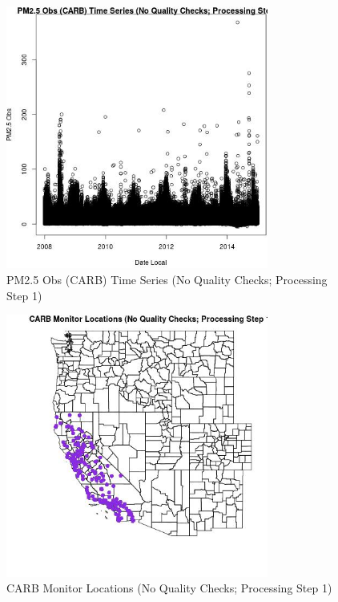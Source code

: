 
\begin{figure} 
\centering  
\includegraphics[width=0.77\textwidth]{Code_Outputs/PM25Source8TSstep1_PM25_ObsvDate_Local.jpg} 
\caption{\label{fig:PM25Source8TSstep1PM25_ObsvDate_Local}PM2.5 Obs (CARB) Time Series (No Quality Checks; Processing Step 1)} 
\end{figure} 
 

\begin{figure} 
\centering  
\includegraphics[width=0.77\textwidth]{Code_Outputs/PM25Source8TSstep1_MapCARBLocations.jpg} 
\caption{\label{fig:PM25Source8TSstep1MapCARBLocations}CARB Monitor Locations (No Quality Checks; Processing Step 1)} 
\end{figure} 
 
